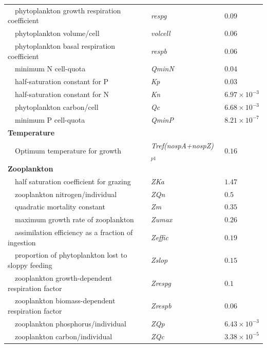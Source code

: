 \documentclass[review]{elsarticle}\usepackage[]{graphicx}\usepackage[]{color}
\begin{document}
\begin{table}[!tbp]
{\begin{center}
\begin{tabular}{lll}
~~phytoplankton growth respiration coefficient&\textit{respg}&$0.09$\tabularnewline
~~phytoplankton volume/cell&\textit{volcell}&$0.06$\tabularnewline
~~phytoplankton basal respiration coefficient&\textit{respb}&$0.06$\tabularnewline
~~minimum N cell-quota&\textit{QminN}&$0.04$\tabularnewline
~~half-saturation constant for P&\textit{Kp}&$0.03$\tabularnewline
~~half-saturation constant for N&\textit{Kn}&$6.97\times 10^{-3}$\tabularnewline
~~phytoplankton carbon/cell&\textit{Qc}&$6.68\times 10^{-3}$\tabularnewline
~~minimum P cell-quota&\textit{QminP}&$8.21\times 10^{-7}$\tabularnewline
\hline
{\bfseries Temperature}&&\tabularnewline
~~Optimum temperature for growth&\textit{Tref(nospA+nospZ)$_{p1}$}&$0.16$\tabularnewline
\hline
{\bfseries Zooplankton}&&\tabularnewline
~~half saturation coefficient for grazing&\textit{ZKa}&$1.47$\tabularnewline
~~zooplankton nitrogen/individual&\textit{ZQn}&$0.5$\tabularnewline
~~quadratic mortality constant&\textit{Zm}&$0.35$\tabularnewline
~~maximum growth rate of zooplankton&\textit{Zumax}&$0.26$\tabularnewline
~~assimilation efficiency as a fraction of ingestion&\textit{Zeffic}&$0.19$\tabularnewline
~~proportion of phytoplankton lost to sloppy feeding&\textit{Zslop}&$0.15$\tabularnewline
~~zooplankton growth-dependent respiration factor&\textit{Zrespg}&$0.1$\tabularnewline
~~zooplankton biomass-dependent respiration factor&\textit{Zrespb}&$0.06$\tabularnewline
~~zooplankton phosphorus/individual&\textit{ZQp}&$6.43\times 10^{-3}$\tabularnewline
~~zooplankton carbon/individual&\textit{ZQc}&$3.38\times 10^{-5}$\tabularnewline
\hline
\end{tabular}\end{center}}
\end{table}


\clearpage

\end{document}
